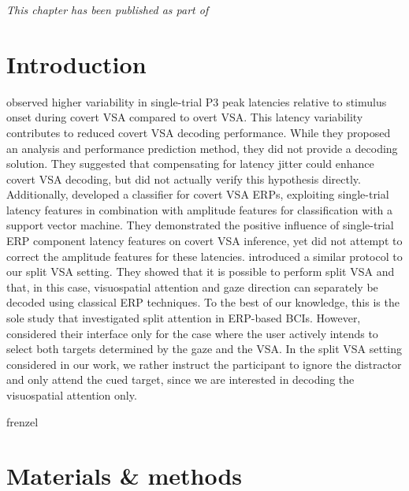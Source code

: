 \emph{This chapter has been published as part of~\textcite{VanDenKerchove2024}}

\section{Introduction}

\textcite{Arico2014} observed higher variability in single-trial P3 peak
latencies relative to stimulus onset during covert VSA compared to overt VSA.
This latency variability contributes to reduced covert VSA decoding performance.
While they proposed an analysis and performance prediction method, they did not provide a
decoding solution.
They suggested that compensating for latency jitter could enhance covert VSA
decoding, but did not actually verify this hypothesis directly.
Additionally, \cite{Hardiansyah2020} developed a classifier for
covert VSA ERPs, exploiting single-trial latency features in combination with
amplitude features for classification with a support vector machine.
They demonstrated the positive influence of single-trial ERP component latency
features on covert VSA inference, yet did not attempt to correct the amplitude
features for these latencies.
\textcite{Frenzel2011} introduced a similar protocol to our split VSA
setting.
They showed that it is possible to perform split VSA and that, in this
case, visuospatial attention and gaze direction can separately be decoded using
classical ERP techniques.
To the best of our
knowledge, this is the sole study that investigated split attention in ERP-based BCIs.
However, \textcite{Frenzel2011} considered their interface only for the case
where the user actively intends to select both targets determined by the gaze
and the VSA.
In the split VSA setting considered in our work, we rather instruct the participant to ignore
the distractor and only attend the cued target, since we are interested in
decoding the visuospatial attention only.

frenzel

\section{Materials \& methods}


